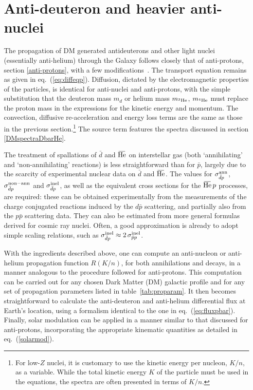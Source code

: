 \section{Anti-deuteron and heavier anti-nuclei}\label{sec:antideuterons}
The propagation of DM generated antideuterons and other light nuclei (essentially anti-helium) through the Galaxy follows closely that of anti-protons, section \ref{anti-protons}, with a few modifications~\cite{DbarHebarpropagation}. 
The transport equation remains as given in eq.~(\ref{eq:diffeqp}). 
Diffusion, dictated by the electromagnetic properties of the particles, is identical for anti-nuclei and anti-protons, with the simple substitution that the deuteron mass $m_d$ or helium mass $m_{^3{\rm He}}$, $m_{^4{\rm He}}$ must replace the proton mass in the expressions for the kinetic energy and momentum.
The convection, diffusive re-acceleration and energy loss terms are the same as those in the previous section.\footnote{
For low-$Z$ nuclei, it is customary to use the kinetic energy per nucleon, $K/n$, as a variable.
While the total kinetic energy $K$ of the particle must be used in the equations, the spectra are often presented in terms of $K/n$.}
The source term features the spectra discussed in section \ref{DMspectraDbarHe}.


\medskip

The treatment of spallations of $\bar d$ and $\overbar{\rm He}$ on interstellar gas (both `annihilating' and `non-annihilating' reactions) 
is less straightforward than for $\bar p$, largely due to the scarcity of experimental nuclear data on $\bar d$ and $\overbar {\rm He}$. The values for  $\sigma^{\rm ann}_{\bar{d}p}$, $\sigma^{\rm non-ann}_{\bar{d}p}$ and $\sigma^{\rm inel}_{\bar{d}p}$, as well as the equivalent cross sections for the $\overbar {\rm He} \, p$ processes, are required: these can be obtained experimentally from the measurements of the charge conjugated reactions induced by the $d \bar{p}$ scattering, and partially also from the $p\bar{p}$ scattering data. They can also be estimated from more general formulas derived for cosmic ray nuclei. 
Often, a good approximation is already to 
adopt simple scaling relations, such as $\sigma^{\rm inel}_{\bar{d}p} \approx 2\, \sigma^{\rm inel}_{\bar{p}p}$.


\medskip

With the ingredients described above, one can compute an anti-nucleon or anti-helium propagation function $R(K/n)$, for both annihilations and decays, in a manner analogous to the procedure followed for anti-protons. This computation can be carried out for any chosen Dark Matter (DM) galactic profile and for any set of propagation parameters listed in table~\ref{tab:proparam}. 
 It then becomes straightforward to calculate the anti-deuteron and anti-helium differential flux at Earth's location, using a formalism identical to the one in eq.~(\ref{eq:fluxpbar}).
Finally, solar modulation can be applied in a manner similar to that discussed for anti-protons, incorporating the appropriate kinematic quantities as detailed in eq.~(\ref{solarmod}). 



